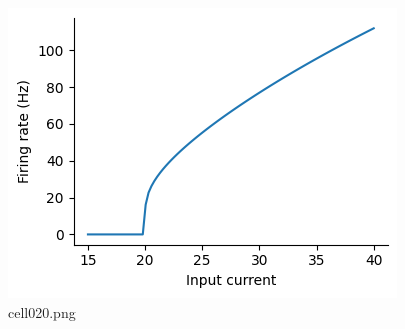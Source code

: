 \begin{figure}[ht]
	\centering
	\includegraphics[scale=0.8, max width=\linewidth]{./fig/neuron-model/lif/cell020.png}
	\caption{cell020.png}
	\label{cell020.png}
\end{figure}